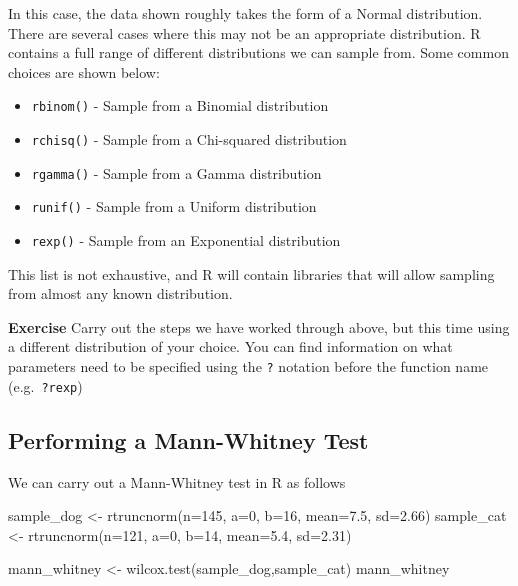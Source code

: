 \documentclass[
]{book}
\newenvironment{Shaded}{\begin{snugshade}}{\end{snugshade}}
\newcommand{\AttributeTok}[1]{\textcolor[rgb]{0.77,0.63,0.00}{#1}}
\newcommand{\DecValTok}[1]{\textcolor[rgb]{0.00,0.00,0.81}{#1}}
\newcommand{\FloatTok}[1]{\textcolor[rgb]{0.00,0.00,0.81}{#1}}
\newcommand{\FunctionTok}[1]{\textcolor[rgb]{0.00,0.00,0.00}{#1}}
\newcommand{\NormalTok}[1]{#1}
\newcommand{\OtherTok}[1]{\textcolor[rgb]{0.56,0.35,0.01}{#1}}
\providecommand{\tightlist}{%
  \setlength{\itemsep}{0pt}\setlength{\parskip}{0pt}}
\begin{document}
In this case, the data shown roughly takes the form of a Normal distribution. There are several cases where this may not be an appropriate distribution. R contains a full range of different distributions we can sample from. Some common choices are shown below:

\begin{itemize}
\tightlist
\item
  \texttt{rbinom()} - Sample from a Binomial distribution
\item
  \texttt{rchisq()} - Sample from a Chi-squared distribution
\item
  \texttt{rgamma()} - Sample from a Gamma distribution
\item
  \texttt{runif()} - Sample from a Uniform distribution
\item
  \texttt{rexp()} - Sample from an Exponential distribution
\end{itemize}

This list is not exhaustive, and R will contain libraries that will allow sampling from almost any known distribution.

\textbf{Exercise}
Carry out the steps we have worked through above, but this time using a different distribution of your choice. You can find information on what parameters need to be specified using the \texttt{?} notation before the function name (e.g.~\texttt{?rexp})

\hypertarget{performing-a-mann-whitney-test}{%
\subsection{Performing a Mann-Whitney Test}\label{performing-a-mann-whitney-test}}

We can carry out a Mann-Whitney test in R as follows

\begin{Shaded}
\begin{Highlighting}[]
\NormalTok{sample\_dog }\OtherTok{\textless{}{-}} \FunctionTok{rtruncnorm}\NormalTok{(}\AttributeTok{n=}\DecValTok{145}\NormalTok{, }\AttributeTok{a=}\DecValTok{0}\NormalTok{, }\AttributeTok{b=}\DecValTok{16}\NormalTok{, }\AttributeTok{mean=}\FloatTok{7.5}\NormalTok{, }\AttributeTok{sd=}\FloatTok{2.66}\NormalTok{)}
\NormalTok{sample\_cat }\OtherTok{\textless{}{-}} \FunctionTok{rtruncnorm}\NormalTok{(}\AttributeTok{n=}\DecValTok{121}\NormalTok{, }\AttributeTok{a=}\DecValTok{0}\NormalTok{, }\AttributeTok{b=}\DecValTok{14}\NormalTok{, }\AttributeTok{mean=}\FloatTok{5.4}\NormalTok{, }\AttributeTok{sd=}\FloatTok{2.31}\NormalTok{)}

\NormalTok{mann\_whitney }\OtherTok{\textless{}{-}} \FunctionTok{wilcox.test}\NormalTok{(sample\_dog,sample\_cat)}
\NormalTok{mann\_whitney}
\end{Highlighting}
\end{Shaded}
\end{document}
